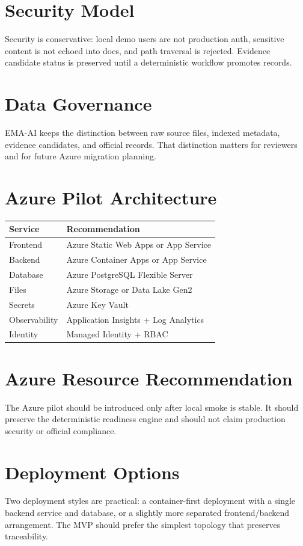 \documentclass[11pt]{article}
\begin{document}
\section{Security Model}
Security is conservative: local demo users are not production auth, sensitive content is not echoed into docs, and path traversal is rejected. Evidence candidate status is preserved until a deterministic workflow promotes records.

\section{Data Governance}
EMA-AI keeps the distinction between raw source files, indexed metadata, evidence candidates, and official records. That distinction matters for reviewers and for future Azure migration planning.

\section{Azure Pilot Architecture}
\begin{tabularx}{\textwidth}{@{}lX@{}}
\toprule
Service & Recommendation \\
\midrule
Frontend & Azure Static Web Apps or App Service \\
Backend & Azure Container Apps or App Service \\
Database & Azure PostgreSQL Flexible Server \\
Files & Azure Storage or Data Lake Gen2 \\
Secrets & Azure Key Vault \\
Observability & Application Insights + Log Analytics \\
Identity & Managed Identity + RBAC \\
\bottomrule
\end{tabularx}

\section{Azure Resource Recommendation}
The Azure pilot should be introduced only after local smoke is stable. It should preserve the deterministic readiness engine and should not claim production security or official compliance.

\section{Deployment Options}
Two deployment styles are practical: a container-first deployment with a single backend service and database, or a slightly more separated frontend/backend arrangement. The MVP should prefer the simplest topology that preserves traceability.
\end{document}
